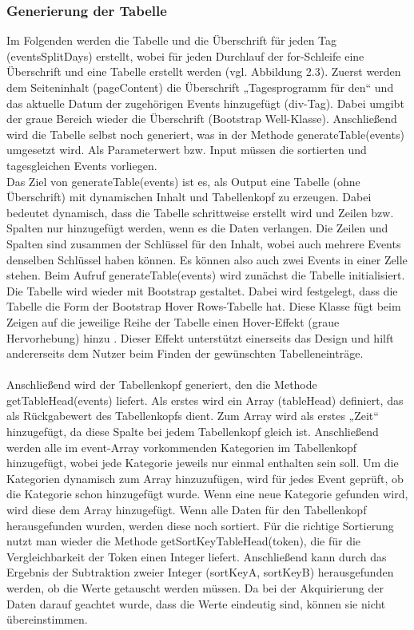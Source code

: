 \subsubsection{Generierung der Tabelle}
Im Folgenden werden die Tabelle und die Überschrift für jeden Tag (eventsSplitDays) erstellt, wobei für jeden Durchlauf der for-Schleife eine Überschrift und eine Tabelle erstellt werden (vgl. Abbildung 2.3). Zuerst werden dem Seiteninhalt (pageContent) die Überschrift „Tagesprogramm für den“ und das aktuelle Datum der zugehörigen Events hinzugefügt (div-Tag). Dabei umgibt der graue Bereich wieder die Überschrift (Bootstrap Well-Klasse). 
Anschließend wird die Tabelle selbst noch generiert, was in der Methode generateTable(events) umgesetzt wird. Als Parameterwert bzw. Input müssen die sortierten und tagesgleichen Events vorliegen. \\
Das Ziel von generateTable(events) ist es, als Output eine Tabelle (ohne Überschrift) mit dynamischen Inhalt und Tabellenkopf zu erzeugen. Dabei bedeutet dynamisch, dass die Tabelle schrittweise erstellt wird und Zeilen bzw. Spalten nur hinzugefügt werden, wenn es die Daten verlangen. Die Zeilen und Spalten sind zusammen der Schlüssel für den Inhalt, wobei auch mehrere Events denselben Schlüssel haben können. Es können also auch zwei Events in einer Zelle stehen. 
Beim Aufruf generateTable(events) wird zunächst die Tabelle initialisiert. Die Tabelle wird wieder mit Bootstrap gestaltet. Dabei wird festgelegt, dass die Tabelle die Form der Bootstrap Hover Rows-Tabelle hat. Diese Klasse fügt beim Zeigen auf die jeweilige Reihe der Tabelle einen Hover-Effekt (graue Hervorhebung) hinzu \cite{table}.  Dieser Effekt unterstützt einerseits das Design und hilft andererseits dem Nutzer beim Finden der gewünschten Tabelleneinträge. \\
\\
Anschließend wird der Tabellenkopf generiert, den die Methode getTableHead(events) liefert. Als erstes wird ein Array (tableHead) definiert, das als Rückgabewert des Tabellenkopfs dient. Zum Array wird als erstes „Zeit“ hinzugefügt, da diese Spalte bei jedem Tabellenkopf gleich ist. Anschließend werden alle im event-Array vorkommenden Kategorien im Tabellenkopf hinzugefügt, wobei jede Kategorie jeweils nur einmal enthalten sein soll. Um die Kategorien dynamisch zum Array hinzuzufügen, wird für jedes Event geprüft, ob die Kategorie schon hinzugefügt wurde. Wenn eine neue Kategorie gefunden wird, wird diese dem Array hinzugefügt. Wenn alle Daten für den Tabellenkopf herausgefunden wurden, werden diese noch sortiert. Für die richtige Sortierung nutzt man wieder die Methode getSortKeyTableHead(token), die für die Vergleichbarkeit der Token einen Integer liefert. Anschließend kann durch das Ergebnis der Subtraktion zweier Integer (sortKeyA, sortKeyB) herausgefunden werden, ob die Werte getauscht werden müssen. Da bei der Akquirierung der Daten darauf geachtet wurde, dass die Werte eindeutig sind, können sie nicht übereinstimmen.
